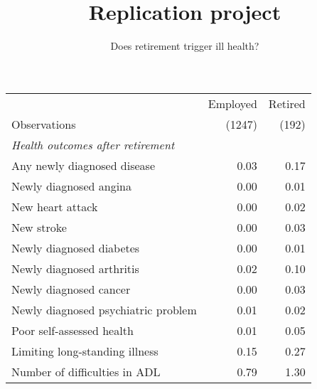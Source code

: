 \documentclass[12pt]{article}
\title{\vspace{-8ex} Replication project \vspace{-2ex}}
\author{Does retirement trigger ill health?}
\date{\vspace{-4ex}}
\begin{document}
\maketitle

\begin{tabular}{lrr}
    \toprule
    & Employed & Retired \\
    Observations & (1247) & (192) \\
    \midrule
    \textit{Health outcomes after retirement} & & \\
    Any newly diagnosed disease & 0.03 & 0.17 \\
    Newly diagnosed angina & 0.00 & 0.01 \\
    New heart attack & 0.00 & 0.02 \\
    New stroke & 0.00 & 0.03 \\
    Newly diagnosed diabetes & 0.00 & 0.01 \\
    Newly diagnosed arthritis & 0.02 & 0.10 \\
    Newly diagnosed cancer & 0.00 & 0.03 \\
    Newly diagnosed psychiatric problem & 0.01 & 0.02 \\
    Poor self-assessed health & 0.01 & 0.05 \\
    Limiting long-standing illness & 0.15 & 0.27 \\
    Number of difficulties in ADL & 0.79 & 1.30 \\
    \bottomrule
\end{tabular}    
\end{document}
